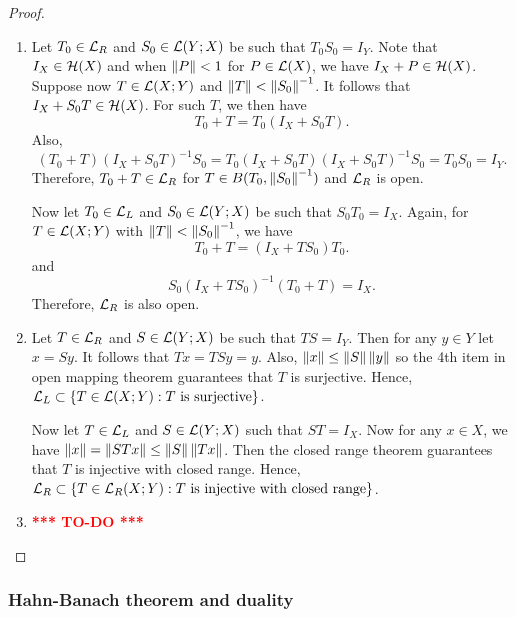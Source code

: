 \documentclass[a4paper]{article}
\newcommand{\TODO}{\textcolor{red}{\textbf{*** TO-DO ***}}}
\begin{document}
\begin{proof}
  \begin{enumerate}
    \item Let $T_0 \in \mathcal{L}_R$ and $S_0 \in \mathcal{L}(Y; X)$ be such that $T_0 S_0
          = I_Y$. Note that $I_X \in \mathcal{H}(X)$ and when $\left\lVert P\right\rVert < 1$ for $P
          \in \mathcal{L}(X)$, we have $I_X + P \in \mathcal{H}(X)$. Suppose now $T \in
          \mathcal{L}(X; Y)$ and $\left\lVert T\right\rVert < \left\lVert S_0\right\rVert^{-1}$. It follows that $I_X
          + S_0 T \in \mathcal{H}(X)$. For such $T$, we then have
          \[
            T_0 + T = T_0 (I_X + S_0 T).
          \]
          Also,
          \[
            (T_0 + T) (I_X + S_0 T)^{-1} S_0 = T_0 (I_X + S_0 T) (I_X + S_0 T)^{-1} S_0
            = T_0 S_0 = I_Y.
          \]
          Therefore, $T_0 + T \in \mathcal{L}_R$ for $T \in B(T_0,
          \left\lVert S_0\right\rVert^{-1})$ and $\mathcal{L}_R$ is open.

          Now let $T_0 \in \mathcal{L}_L$ and $S_0 \in \mathcal{L}(Y; X)$ be such that $S_0
          T_0 = I_X$. Again, for $T \in \mathcal{L}(X; Y)$ with $\left\lVert T\right\rVert <
          \left\lVert S_0\right\rVert^{-1}$, we have
          \[
            T_0 + T = (I_X + T S_0) T_0.
          \]
          and
          \[
            S_0 (I_X + T S_0)^{-1} (T_0 + T) = I_X.
          \]
          Therefore, $\mathcal{L}_R$ is also open.

    \item Let $T \in \mathcal{L}_R$ and $S \in \mathcal{L}(Y; X)$ be such that $TS = I_Y$.
          Then for any $y \in Y$ let $x = Sy$. It follows that $Tx = TSy =
          y$. Also, $\left\lVert x\right\rVert \leq \left\lVert S\right\rVert \left\lVert y\right\rVert$ so the 4th item in
          open mapping theorem guarantees that $T$ is surjective. Hence,
          $\mathcal{L}_L \subset \left\{ T \in \mathcal{L}(X; Y) : \text{$T$ is
          surjective}\right\}$.

          Now let $T \in \mathcal{L}_L$ and $S \in \mathcal{L}(Y; X)$ such that $ST = I_X$.
          Now for any $x \in X$, we have $\left\lVert x\right\rVert = \left\lVert STx\right\rVert \leq
          \left\lVert S\right\rVert \left\lVert Tx\right\rVert$. Then the closed range theorem guarantees
          that $T$ is injective with closed range. Hence, $\mathcal{L}_R \subset
          \left\{ T \in \mathcal{L}_R(X; Y) : \text{$T$ is injective with closed
          range} \right\}$.

    \item \TODO
  \end{enumerate}

\end{proof}

\subsubsection{Hahn-Banach theorem and duality}
\end{document}
